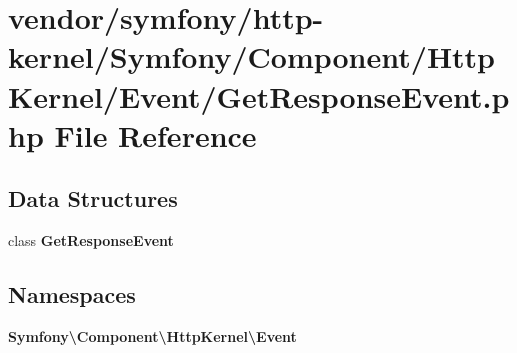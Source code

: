 \section{vendor/symfony/http-\/kernel/\+Symfony/\+Component/\+Http\+Kernel/\+Event/\+Get\+Response\+Event.php File Reference}
\label{_get_response_event_8php}
\subsection*{Data Structures}
\begin{DoxyCompactItemize}
\item 
class {\bf Get\+Response\+Event}
\end{DoxyCompactItemize}
\subsection*{Namespaces}
\begin{DoxyCompactItemize}
\item 
 {\bf Symfony\textbackslash{}\+Component\textbackslash{}\+Http\+Kernel\textbackslash{}\+Event}
\end{DoxyCompactItemize}

